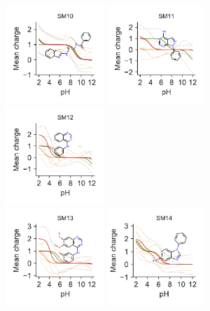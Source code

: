 \documentclass[9pt,lineno,final]{elife}
\begin{document}
	
\begin{figure}[hbtp]	
	\centering
	\includegraphics[width=0.33\textwidth]{Reports/SM10-titrationcurve-views.pdf}
	\includegraphics[width=0.33\textwidth]{Reports/SM11-titrationcurve-views.pdf}
	\includegraphics[width=0.33\textwidth]{Reports/SM12-titrationcurve-views.pdf}	 \\
	\includegraphics[width=0.33\textwidth]{Reports/SM13-titrationcurve-views.pdf}
	\includegraphics[width=0.33\textwidth]{Reports/SM14-titrationcurve-views.pdf}

\end{figure}
\end{document}
